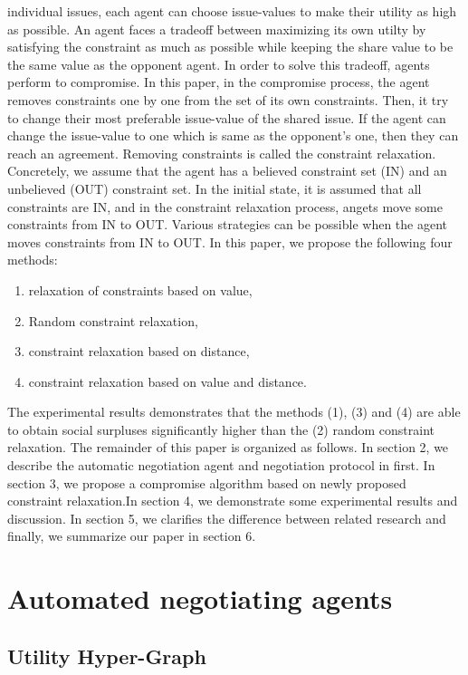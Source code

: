 \documentclass[paper]{ieice}
\begin{document}
individual issues, each agent can choose issue-values to make their utility as high as possible. An agent faces a tradeoff between maximizing its own utilty by satisfying the constraint as much as possible while keeping the share value to be the same value as the opponent agent. In order to solve this tradeoff, agents perform to compromise. In this paper, in the compromise process, the agent removes constraints one by one from the set of its own constraints. Then, it try to change their most preferable issue-value of the shared issue. If the agent can change the issue-value to one which is same as the opponent's one, then they can reach an agreement. Removing constraints is called the constraint relaxation. Concretely, we assume that the agent has a believed constraint set (IN) and an unbelieved (OUT) constraint set. In the initial state, it is assumed that all constraints are IN, and in the constraint relaxation process, angets move some constraints from IN to OUT. Various strategies can be possible when the agent moves constraints from IN to OUT. In this paper, we propose the following four methods:
\begin{enumerate}
\renewcommand{\labelenumi}{(\arabic{enumi})}
\item relaxation of constraints based on value,
\item Random constraint relaxation,
\item constraint relaxation based on distance, 
\item constraint relaxation based on value and distance.\\
\end{enumerate}
 The experimental results demonstrates that the methods (1), (3) and (4) are able to obtain social surpluses significantly higher than the (2) random constraint relaxation. The remainder of this paper is organized as follows. In section 2, we describe the automatic negotiation agent and negotiation protocol in first. In section 3, we propose a compromise algorithm based on newly proposed constraint relaxation.In section 4, we demonstrate some experimental results and discussion. In section 5, we clarifies the difference between related research and finally, we summarize our paper in section 6. 

\section{Automated negotiating agents}
\subsection{Utility Hyper-Graph}
\end{document}
